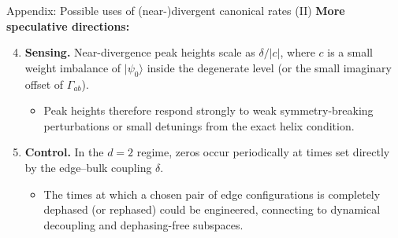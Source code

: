 \documentclass[aspectratio=169,11pt]{beamer}
\newcommand{\ket}[1]{\lvert #1\rangle}
\begin{document}
\begin{frame}{Appendix: Possible uses of (near-)divergent canonical rates (II)}
\small
\textbf{More speculative directions:}
\medskip
\begin{enumerate}\setcounter{enumi}{3}\setlength\itemsep{10pt}
\item \textbf{Sensing.}
Near-divergence peak heights scale as $\delta/\lvert c\rvert$, where $c$ is a small weight imbalance of $\ket{\psi_0}$ inside the degenerate level (or the small imaginary offset of $\Gamma_{ab}$).
\begin{itemize}\footnotesize\setlength\itemsep{3pt}
\item Peak heights therefore respond strongly to weak symmetry-breaking perturbations or small detunings from the exact helix condition.
\end{itemize}
\item \textbf{Control.}
In the $d=2$ regime, zeros occur periodically at times set directly by the edge--bulk coupling $\delta$.
\begin{itemize}\footnotesize\setlength\itemsep{3pt}
\item The times at which a chosen pair of edge configurations is completely dephased (or rephased) could be engineered, connecting to dynamical decoupling and dephasing-free subspaces.
\end{itemize}
\end{enumerate}
\end{frame}
\end{document}
